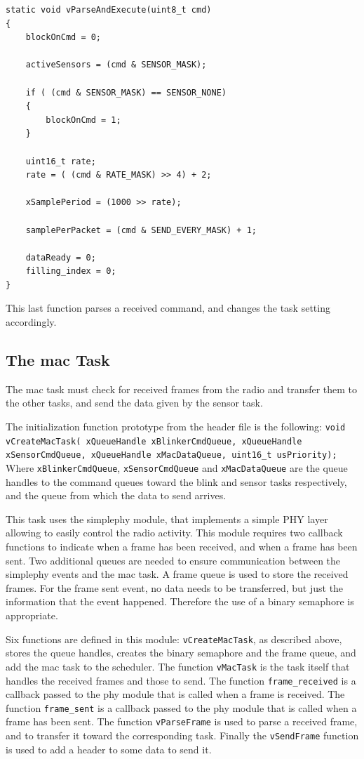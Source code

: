 \documentclass[11pt]{report}
\begin{document}
\begin{verbatim}
static void vParseAndExecute(uint8_t cmd)
{
    blockOnCmd = 0;

    activeSensors = (cmd & SENSOR_MASK);

    if ( (cmd & SENSOR_MASK) == SENSOR_NONE)
    {
        blockOnCmd = 1;
    }

    uint16_t rate;
    rate = ( (cmd & RATE_MASK) >> 4) + 2;

    xSamplePeriod = (1000 >> rate);

    samplePerPacket = (cmd & SEND_EVERY_MASK) + 1;

    dataReady = 0;
    filling_index = 0;
}
\end{verbatim}
This last function parses a received command, and changes the task setting accordingly.

\subsection{The mac Task}

The mac task must check for received frames from the radio and transfer them to the other tasks, and send the data given by the sensor task.

The initialization function prototype from the header file is the following:
\verb$void vCreateMacTask( xQueueHandle xBlinkerCmdQueue, xQueueHandle xSensorCmdQueue, xQueueHandle xMacDataQueue, uint16_t usPriority);$
Where \verb$xBlinkerCmdQueue$, \verb$xSensorCmdQueue$ and \verb$xMacDataQueue$ are the queue handles to the command queues toward the blink and sensor tasks respectively, and the queue from which the data to send arrives.

This task uses the simplephy module, that implements a simple PHY layer allowing to easily control the radio activity. This module requires two callback functions to indicate when a frame has been received, and when a frame has been sent. Two additional queues are needed to ensure communication between the simplephy events and the mac task. A frame queue is used to store the received frames. For the frame sent event, no data needs to be transferred, but just the information that the event happened. Therefore the use of a binary semaphore is appropriate.

Six functions are defined in this module: \verb$vCreateMacTask$, as described above, stores the queue handles, creates the binary semaphore and the frame queue, and add the mac task to the scheduler. The function \verb$vMacTask$ is the task itself that handles the received frames and those to send. The function \verb$frame_received$ is a callback passed to the phy module that is called when a frame is received. The function \verb$frame_sent$ is a callback passed to the phy module that is called when a frame has been sent. The function \verb$vParseFrame$ is used to parse a received frame, and to transfer it toward the corresponding task. Finally the  \verb$vSendFrame$ function is used to add a header to some data to send it.
\end{document}
